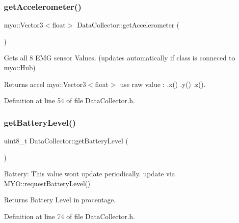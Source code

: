 \subsubsection{\texorpdfstring{get\+Accelerometer()}{getAccelerometer()}}
{\footnotesize\ttfamily myo\+::\+Vector3$<$float$>$ Data\+Collector\+::get\+Accelerometer (\begin{DoxyParamCaption}{ }\end{DoxyParamCaption})\hspace{0.3cm}{\ttfamily [inline]}}



Gets all 8 E\+MG sensor Values. (updates automatically if class is conneced to myo\+::\+Hub) 

\begin{DoxyReturn}{Returns}
accel myo\+::\+Vector3$<$float$>$ use raw value \+: .x() .y() .z(). 
\end{DoxyReturn}


Definition at line 54 of file Data\+Collector.\+h.

\mbox{\label{class_data_collector_a376b4be3194c56e25084df4097968a46}} 
\subsubsection{\texorpdfstring{get\+Battery\+Level()}{getBatteryLevel()}}
{\footnotesize\ttfamily uint8\+\_\+t Data\+Collector\+::get\+Battery\+Level (\begin{DoxyParamCaption}{ }\end{DoxyParamCaption})\hspace{0.3cm}{\ttfamily [inline]}}



Battery\+: This value wont update periodically. update via M\+Y\+O\+::request\+Battery\+Level() 

\begin{DoxyReturn}{Returns}
Battery Level in procentage. 
\end{DoxyReturn}


Definition at line 74 of file Data\+Collector.\+h.

\mbox{\label{class_data_collector_a4992b2e777defed813c7ce15a73bc84b}} 
